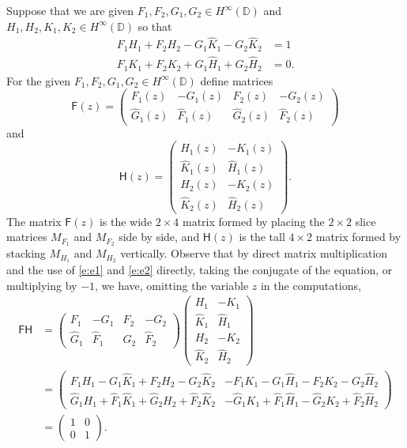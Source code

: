 \documentclass[11pt]{amsart}
\begin{document}
Suppose that we are given $F_1,F_2, G_1,G_2\in H^\infty(\mathbb{D})$ and $H_1,H_2, K_1,K_2\in H^\infty(\mathbb{D})$ so that
\begin{align}
    F_1H_1+F_2H_2-G_1\hat{K}_1-G_2\hat{K}_2 &=1\label{e:e1}\\
    F_1K_1+F_2K_2+G_1\hat{H}_1+G_2\hat{H}_2 &= 0\label{e:e2}.
\end{align}
For the given $F_1,F_2, G_1,G_2\in H^\infty(\mathbb{D})$ define matrices
$$
\mathsf{F}(z)=
\left(
\begin{array}{cccc}
F_1(z) & -G_1(z) & F_2(z) & -G_2(z) \\
\hat G_1(z) & \hat F_1(z) & \hat G_2(z) & \hat F_2(z)
\end{array}
\right)
$$
and
$$
\mathsf{H}(z)=
\left(
\begin{array}{cc}
H_1(z) & -K_1(z) \\
\hat K_1(z) & \hat H_1(z) \\
H_2(z) & -K_2(z) \\
\hat K_2(z) & \hat H_2(z)
\end{array}
\right).
$$
The matrix $\mathsf{F}(z)$ is the wide $2\times 4$ matrix formed by placing the $2\times 2$ slice matrices $M_{F_1}$ and $M_{F_2}$ side by side, and $\mathsf{H}(z)$ is the tall $4\times 2$ matrix formed by stacking $M_{H_1}$ and $M_{H_2}$ vertically.  Observe that by direct matrix multiplication and the use of \eqref{e:e1} and \eqref{e:e2} directly, taking the conjugate of the equation, or multiplying by $-1$, we have, omitting the variable $z$ in the computations,
\begin{align*}
\mathsf{F}\mathsf{H} & =\left(
\begin{array}{cccc}
F_1 & -G_1 & F_2 & -G_2 \\
\hat G_1 & \hat F_1 & \hat G_2 & \hat F_2
\end{array}
\right)\left(
\begin{array}{cc}
H_1 & -K_1 \\
\hat K_1 & \hat H_1 \\
H_2 & -K_2 \\
\hat K_2 & \hat H_2
\end{array}
\right)\\
&=\left(
\begin{array}{cc}
F_1 H_1 - G_1 \hat K_1 + F_2 H_2 - G_2 \hat K_2 & -F_1 K_1 - G_1 \hat H_1 - F_2 K_2 - G_2 \hat H_2 \\
\hat G_1 H_1 + \hat F_1 \hat K_1 + \hat G_2 H_2 + \hat F_2 \hat K_2 & -\hat G_1 K_1 + \hat F_1 \hat H_1 - \hat G_2 K_2 + \hat F_2 \hat H_2
\end{array}
\right)\\
& =\left(
\begin{array}{cc}
  1 & 0\\
  0  & 1
\end{array}
\right).
\end{align*}
\end{document}
